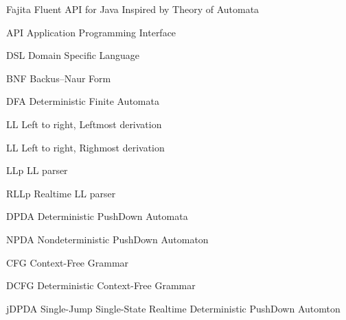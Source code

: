 \begin{abbrv}
\item[Fajita]               Fluent API for Java Inspired by Theory of Automata
\item[API]                  Application Programming Interface  
\item[DSL]                  Domain Specific Language 
\item[BNF]                  Backus–Naur Form
\item[DFA]                  Deterministic Finite Automata
\item[LL]                   Left to right, Leftmost derivation
\item[LL]                   Left to right, Righmost derivation
\item[LLp]                  LL parser 
\item[RLLp]                 Realtime LL parser
\item[DPDA]                 Deterministic PushDown Automata
\item[NPDA]                 Nondeterministic PushDown Automaton
\item[CFG]                  Context-Free Grammar
\item[DCFG]                 Deterministic Context-Free Grammar
\item[jDPDA]                Single-Jump Single-State Realtime Deterministic PushDown Automton

\end{abbrv}


